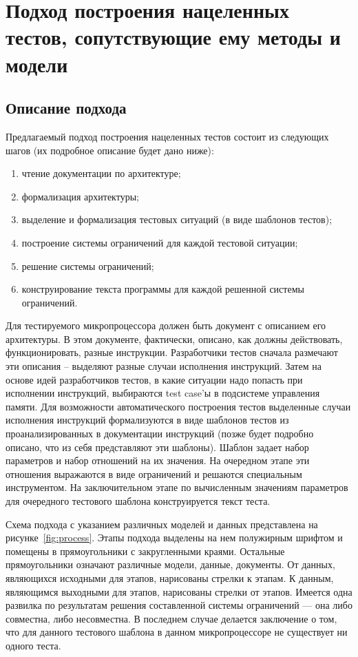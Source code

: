 \chapter{Подход построения нацеленных тестов, сопутствующие ему методы и модели}

\section{Описание подхода}
Предлагаемый подход построения нацеленных тестов состоит из следующих шагов (их подробное описание будет дано ниже):
\begin{enumerate}
    \item чтение документации по архитектуре;
    \item формализация архитектуры;
    \item выделение и формализация тестовых ситуаций (в виде шаблонов тестов);
    \item построение системы ограничений для каждой тестовой ситуации;
    \item решение системы ограничений;
    \item конструирование текста программы для каждой решенной системы ограничений.
\end{enumerate}

Для тестируемого микропроцессора должен быть документ с описанием его архитектуры. В этом документе, фактически, описано, как должны действовать, функционировать, разные инструкции. Разработчики тестов сначала размечают эти описания -- выделяют разные случаи исполнения инструкций. Затем на основе идей разработчиков тестов, в какие ситуации надо попасть при исполнении инструкций, выбираются test case'ы в подсистеме управления памяти. Для возможности автоматического построения тестов выделенные случаи исполнения инструкций формализуются в виде шаблонов тестов из проанализированных в документации инструкций (позже будет подробно описано, что из себя представляют эти шаблоны). Шаблон задает набор параметров и набор отношений на их значения. На очередном этапе эти отношения выражаются в виде ограничений и решаются специальным инструментом. На заключительном этапе по вычисленным значениям параметров для очередного тестового шаблона конструируется текст теста.

Схема подхода с указанием различных моделей и данных представлена на рисунке~\ref{fig:process}. Этапы подхода выделены на нем полужирным шрифтом и помещены в прямоугольники с закругленными краями. Остальные прямоугольники означают различные модели, данные, документы. От данных, являющихся исходными для этапов, нарисованы стрелки к этапам. К данным, являющимся выходными для этапов, нарисованы стрелки от этапов. Имеется одна развилка по результатам решения составленной системы ограничений --- она либо совместна, либо несовместна. В последнем случае делается заключение о том, что для данного тестового шаблона в данном микропроцессоре не существует ни одного теста.

